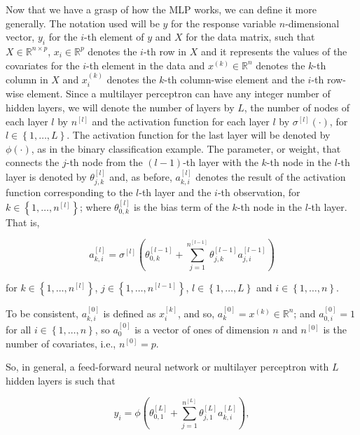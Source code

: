 Now that we have a grasp of how the MLP works, we can define it more generally. The notation used will be $y$ for the response variable $n$-dimensional vector, $y_i$ for the $i$-th element of $y$ and $X$ for the data matrix, such that $X \in \mathbb{R}^{n \times p}$, $x_i \in \mathbb{R}^p$ denotes the $i$-th row in $X$ and it represents the values of the covariates for the $i$-th element in the data and $x^{(k)} \in \mathbb{R}^n$ denotes the $k$-th column in $X$ and $x_i^{(k)}$ denotes the $k$-th column-wise element and the $i$-th row-wise element. Since a multilayer perceptron can have any integer number of hidden layers, we will denote the number of layers by $L$, the number of nodes of each layer $l$ by $n^{[l]}$ and the activation function for each layer $l$ by $\sigma^{[l]}(\cdot)$, for $l \in \left\{ 1, \ldots, L \right\}$. The activation function for the last layer will be denoted by $\phi(\cdot)$, as in the binary classification example. The parameter, or weight, that connects the $j$-th node from the $(l-1)$-th layer with the $k$-th node in the $l$-th layer is denoted by $\theta_{j,k}^{[l]}$ and, as before, $a_{k,i}^{[l]}$ denotes the result of the activation function corresponding to the $l$-th layer and the $i$-th observation, for $k \in \left\{ 1, \ldots, n^{[l]} \right\}$; where $\theta_{0,k}^{[l]}$ is the bias term of the $k$-th node in the $l$-th layer. That is,

\begin{equation}
  \label{eq:ann_act_funct_def}
  a_{k,i}^{[l]} = \sigma^{[l]} \left( \theta_{0,k}^{[l-1]} + \sum_{j = 1}^{n^{[l-1]}} \theta_{j,k}^{[l-1]} a_{j,i}^{[l-1]} \right)
\end{equation}

for $k \in \left\{ 1, \ldots, n^{[l]} \right\}$, $j \in \left\{ 1, \ldots, n^{[l-1]} \right\}$, $l \in \left\{ 1, \ldots, L \right\}$ and $i \in \left\{ 1, \ldots, n \right\}$.

To be consistent, $a_{k,i}^{[0]}$ is defined as $x_i^{[k]}$, and so, $a_{k}^{[0]} = x^{(k)} \in \mathbb{R}^n$; and $a_{0,i}^{[0]} = 1$ for all $i \in \left\{ 1, \ldots, n \right\}$, so $a_{0}^{[0]}$ is a vector of ones of dimension $n$ and $n^{[0]}$ is the number of covariates, i.e., $n^{[0]} = p$.

So, in general, a feed-forward neural network or multilayer perceptron with $L$ hidden layers is such that

$$
  y_i = \phi \left( \theta_{0,1}^{[L]} +  \sum_{j = 1}^{n^{[L]}} \theta_{j,1}^{[L]} a_{k,i}^{[L]} \right),
$$

